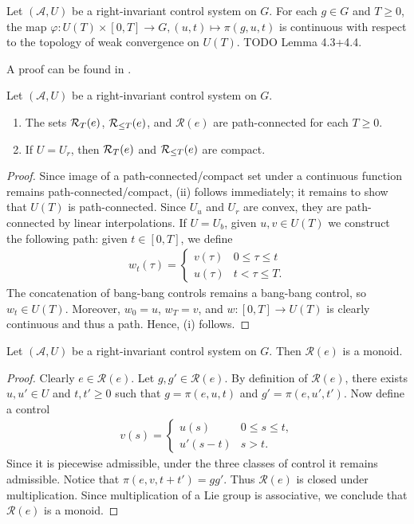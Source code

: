 \documentclass[12pt,class=article,crop=false]{standalone}
\begin{document}
\begin{lemma}
	Let $ (\mathcal{A},U)$ be a right-invariant control system on $G$. For each $ g \in G$ and $ T \geq 0$, the map $ \varphi : U(T) \times [0,T] \to G, (u,t) \mapsto \pi( g,u,t) $ is continuous with respect to the topology of weak convergence on $ U(T)$. TODO Lemma 4.3+4.4.
\end{lemma}
A proof can be found in  \cite{[10]}.
\begin{lemma} \label{lem:path_conn} 
Let $ (\mathcal{A},U)$ be a right-invariant control system on $G$. 
\begin{enumerate}[label=(\roman*)]
	\item The sets $ \mathcal{R}_T( e) $, $ \mathcal{R}_{\le T}( e) $, and $ \mathcal{R}( e) $ are path-connected for each $ T \geq 0$.
	\item If  $ U = U_r$, then  $ \mathcal{R}_T( e) $ and $ \mathcal{R}_{\le T}( e) $ are compact.
\end{enumerate}
\end{lemma}
\begin{proof}
	Since image of a path-connected/compact set under a continuous function remains path-connected/compact, (ii) follows immediately; it remains to show that $ U(T)$ is path-connected. Since $ U_u$ and  $ U_r$ are convex, they are path-connected by linear interpolations. If  $ U = U_b$, given $ u,v \in U(T)$ we construct the following path: given $ t \in [0,T]$, we define
\begin{align*}
	w_t (\tau) = \begin{cases}
		v(\tau) & 0\leq \tau \leq t\\
		u(\tau) & t< \tau \leq T.
	\end{cases}
\end{align*}
The concatenation of bang-bang controls remains a bang-bang control, so $ w_t \in U(T)$. Moreover, $ w_0 = u$,  $ w_T = v$, and  $ w: [0,T] \to U(T)$ is clearly continuous and thus a path. Hence, (i) follows.
\end{proof}
\begin{prop} \label{prop:monoid} 
Let $ ( \mathcal{ A}, U)$ be a right-invariant control system on $ G$. Then $ \mathcal{R}( e) $ is a monoid.
\end{prop}
\begin{proof}
Clearly $ e \in \mathcal{R}( e) $. Let $ g ,g' \in \mathcal{R}( e) $. By definition of $ \mathcal{R}( e) $, there exists $ u,u' \in U$ and $ t,t' \geq 0$ such that  $ g = \pi( e,u,t)$ and $ g' = \pi( e,u',t')$. Now define a control
\begin{align*}
	v(s) =  \begin{cases}
		u(s) & 0\leq s \leq t,\\
		u'(s-t) & s>t.
	\end{cases}
\end{align*}
Since it is piecewise admissible, under the three classes of control it remains admissible. Notice that $ \pi( e,v,t+t') = gg'$. Thus $ \mathcal{R}( e) $ is closed under multiplication. Since multiplication of a Lie group is associative, we conclude that $ \mathcal{R}( e) $ is a monoid.
\end{proof}
\end{document}
